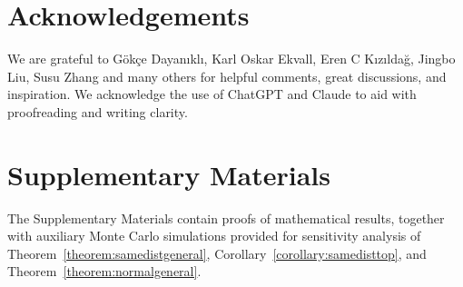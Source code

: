 \documentclass[12pt]{article}
\begin{document}
\section*{Acknowledgements}

We are grateful to G\"ok\c{c}e Dayan\i kl\i, Karl Oskar Ekvall, Eren C K\i z\i lda\u{g}, Jingbo Liu, Susu Zhang and many others for helpful comments, great discussions, and inspiration. We acknowledge the use of ChatGPT and Claude to aid with proofreading and writing clarity. 


\section*{Supplementary Materials}

The Supplementary Materials contain proofs of mathematical results, together with auxiliary Monte Carlo simulations provided for sensitivity analysis of Theorem~\ref{theorem:samedistgeneral}, Corollary~\ref{corollary:samedisttop}, and Theorem~\ref{theorem:normalgeneral}.




\end{document}
